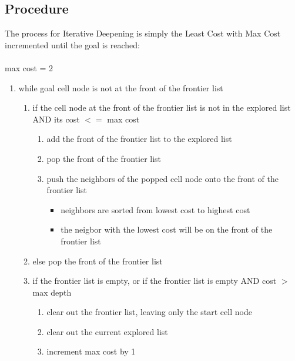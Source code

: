\documentclass[12pt]{article}
\begin{document}
	\subsection{Procedure}
	The process for Iterative Deepening is simply the Least Cost with Max Cost incremented until the goal is reached: 
	\\ \\
	max cost = 2
		\begin{enumerate}
			\item while goal cell node is not at the front of the frontier list
			\begin{enumerate}
				\item if the cell node at the front of the frontier list is not in the explored list AND its cost $<=$ max cost
					\begin{enumerate}
						\item add the front of the frontier list to the explored list
						\item pop the front of the frontier list
						\item push the neighbors of the popped cell node onto the front of the frontier list
						\begin{itemize}
							\item neighbors are sorted from lowest cost to highest cost
							\item the neigbor with the lowest cost will be on the front of the frontier list
						\end{itemize}
					\end{enumerate}
				\item else pop the front of the frontier list
				\item if the frontier list is empty, or if the frontier list is empty AND cost $>$ max depth
				\begin{enumerate}
					\item clear out the frontier list, leaving only the start cell node
					\item clear out the current explored list
					\item increment max cost by 1
				\end{enumerate}
			\end{enumerate}
		\end{enumerate}
\end{document}
